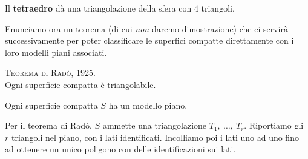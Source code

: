\begin{example}
	Il \textbf{tetraedro} dà una triangolazione della sfera con $4$ triangoli.
\end{example}
Enunciamo ora un teorema (di cui \textit{non} daremo dimostrazione) che ci servirà successivamente per poter classificare le superfici compatte direttamente con i loro modelli piani associati.
\begin{theorema}\textsc{Teorema di Radò, 1925.}\\
	Ogni superficie compatta è triangolabile.
\end{theorema}
\begin{corollary}
	Ogni superficie compatta $S$ ha un modello piano.
\end{corollary}
\begin{demonstration}
	Per il teorema di Radò, $S$ ammette una triangolazione $T_1,\ \ldots,\ T_r$. Riportiamo gli $r$ triangoli nel piano, con i lati identificati. Incolliamo poi i lati uno ad uno fino ad ottenere un unico poligono con delle identificazioni sui lati.
\end{demonstration}
